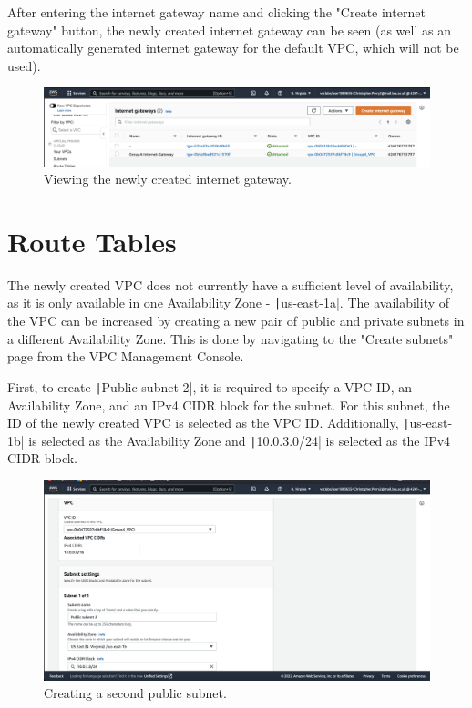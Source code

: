 After entering the internet gateway name and clicking the "Create internet gateway" button, the newly created
internet gateway can be seen (as well as an automatically generated internet gateway for the default VPC, which will not
be used).

\begin{figure}[!htbp]
    \centering
    \includegraphics[width=\textwidth]{resources/vpc/internet-gateway-2}
    \caption{Viewing the newly created internet gateway.}
    \label{fig:internet-gateway-2}
\end{figure}

\section{Route Tables}\label{sec:route-tables}

The newly created VPC does not currently have a sufficient level of availability, as it is only available in one
Availability Zone - \texttt|us-east-1a|.
The availability of the VPC can be increased by creating a new pair of public and private subnets in a different
Availability Zone.
This is done by navigating to the "Create subnets" page from the VPC Management Console.

First, to create \texttt|Public subnet 2|, it is required to specify a VPC ID, an Availability Zone, and an
IPv4 CIDR block for the subnet.
For this subnet, the ID of the newly created VPC is selected as the VPC ID\@.
Additionally, \texttt|us-east-1b| is selected as the Availability Zone and
\texttt|10.0.3.0/24| is selected as the IPv4 CIDR block.

\begin{figure}[!htbp]
    \centering
    \includegraphics[width=\textwidth]{resources/vpc/routes/vpc-public-subnet-2}
    \caption{Creating a second public subnet.}
    \label{fig:vpc-public-subnet-2}
\end{figure}

